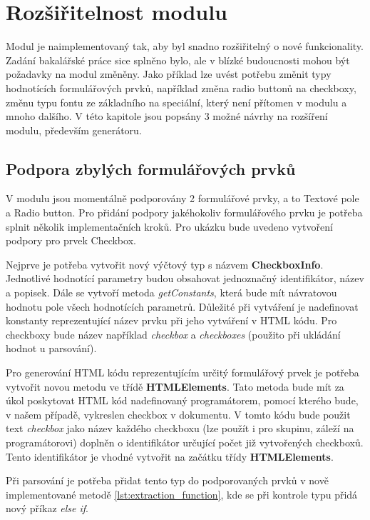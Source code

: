 \chapter{Rozšiřitelnost modulu}
Modul je naimplementovaný tak, aby byl snadno rozšiřitelný o nové funkcionality. Zadání bakalářské práce sice splněno bylo, ale v blízké budoucnosti mohou být požadavky na modul změněny. Jako příklad lze uvést potřebu změnit typy hodnotících formulářových prvků, například změna radio buttonů na checkboxy, změnu typu fontu ze základního na speciální, který není přítomen v modulu a mnoho dalšího. V této kapitole jsou popsány 3 možné návrhy na rozšíření modulu, především generátoru.

\section{Podpora zbylých formulářových prvků}
V modulu jsou momentálně podporovány 2 formulářové prvky, a to Textové pole a Radio button. Pro přidání podpory jakéhokoliv formulářového prvku je potřeba splnit několik implementačních kroků. Pro ukázku bude uvedeno vytvoření podpory pro prvek Checkbox.
\par
Nejprve je potřeba vytvořit nový výčtový typ s názvem \textbf{CheckboxInfo}. Jednotlivé hodnotící parametry budou obsahovat jednoznačný identifikátor, název a popisek. Dále se vytvoří metoda \textit{getConstants}, která bude mít návratovou hodnotu pole všech hodnotících parametrů. Důležité při vytváření je nadefinovat konstanty reprezentující název prvku při jeho vytváření v HTML kódu. Pro checkboxy bude název například \textit{checkbox} a \textit{checkboxes} (použito při ukládání hodnot u parsování).
\par
Pro generování HTML kódu reprezentujícím určitý formulářový prvek je potřeba vytvořit novou metodu ve třídě \textbf{HTMLElements}. Tato metoda bude mít za úkol poskytovat HTML kód nadefinovaný programátorem, pomocí kterého bude, v našem případě, vykreslen checkbox v dokumentu. V tomto kódu bude použit text \textit{checkbox} jako název každého checkboxu (lze použít i pro skupinu, záleží na programátorovi) doplněn o identifikátor určující počet již vytvořených checkboxů. Tento identifikátor je vhodné vytvořit na začátku třídy \textbf{HTMLElements}.
\par
Při parsování je potřeba přidat tento typ do podporovaných prvků v nově implementované metodě \ref{lst:extraction_function}, kde se při kontrole typu přidá nový příkaz \textit{else if}.
\par
